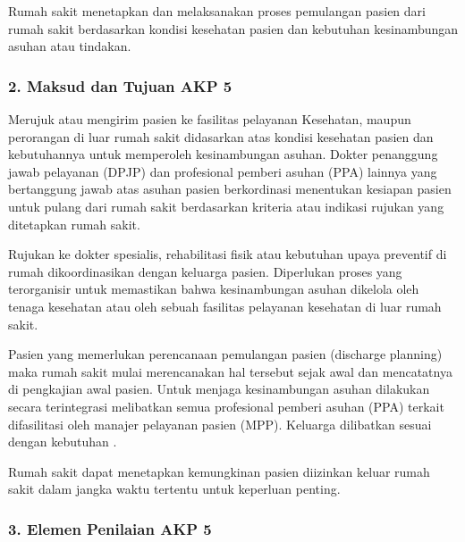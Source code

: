 \documentclass[
]{book}
\begin{document}
Rumah sakit menetapkan dan melaksanakan proses pemulangan pasien dari rumah sakit berdasarkan kondisi kesehatan pasien dan kebutuhan kesinambungan asuhan atau tindakan.

\hypertarget{maksud-dan-tujuan-akp-5}{%
\subsubsection*{2. Maksud dan Tujuan AKP 5}\label{maksud-dan-tujuan-akp-5}}

Merujuk atau mengirim pasien ke fasilitas pelayanan Kesehatan, maupun perorangan di luar rumah sakit didasarkan atas kondisi kesehatan pasien dan kebutuhannya untuk memperoleh kesinambungan asuhan. Dokter penanggung jawab pelayanan (DPJP) dan profesional pemberi asuhan (PPA) lainnya yang bertanggung jawab atas asuhan pasien berkordinasi menentukan kesiapan pasien untuk pulang dari rumah sakit berdasarkan kriteria atau indikasi rujukan yang ditetapkan rumah sakit.

Rujukan ke dokter spesialis, rehabilitasi fisik atau kebutuhan upaya preventif di rumah dikoordinasikan dengan keluarga pasien. Diperlukan proses yang terorganisir untuk memastikan bahwa kesinambungan asuhan dikelola oleh tenaga kesehatan atau oleh sebuah fasilitas pelayanan kesehatan di luar rumah sakit.

Pasien yang memerlukan perencanaan pemulangan pasien (discharge planning) maka rumah sakit mulai merencanakan hal tersebut sejak awal dan mencatatnya di pengkajian awal pasien. Untuk menjaga kesinambungan asuhan dilakukan secara terintegrasi melibatkan semua profesional pemberi asuhan (PPA) terkait difasilitasi oleh manajer pelayanan pasien (MPP). Keluarga dilibatkan sesuai dengan kebutuhan .

Rumah sakit dapat menetapkan kemungkinan pasien diizinkan keluar rumah sakit dalam jangka waktu tertentu untuk keperluan penting.

\hypertarget{elemen-penilaian-akp-5}{%
\subsubsection*{3. Elemen Penilaian AKP 5}\label{elemen-penilaian-akp-5}}
\end{document}
